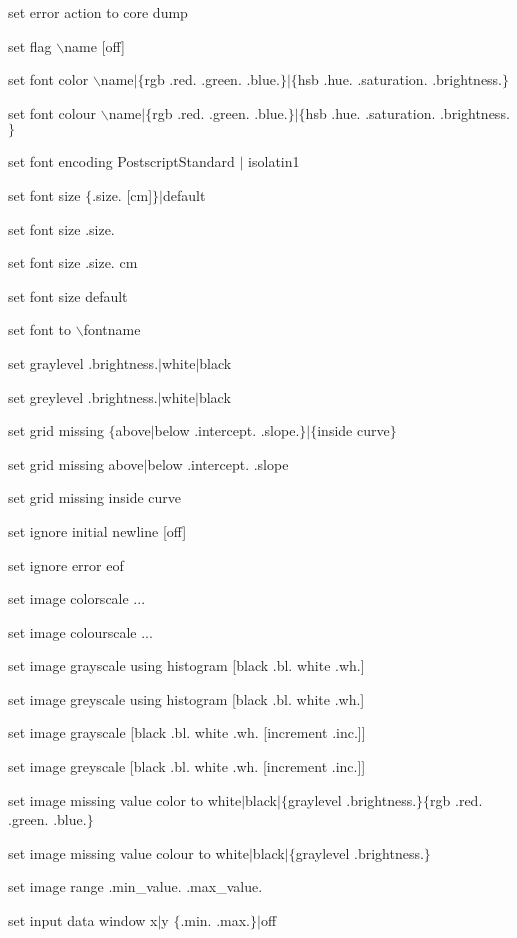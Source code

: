 set error action to core dump

set flag $\backslash$name [off]

set font color $\backslash$name$\mid$$\lbrace$rgb .red. .green. .blue.$\rbrace$$\mid$$\lbrace$hsb .hue. .saturation. .brightness.$\rbrace$

set font colour $\backslash$name$\mid$$\lbrace$rgb .red. .green. .blue.$\rbrace$$\mid$$\lbrace$hsb .hue. .saturation. .brightness.$\rbrace$

set font encoding PostscriptStandard $\mid$ isolatin1

set font size $\lbrace$.size. [cm]$\rbrace$$\mid$default

set font size .size.

set font size .size. cm

set font size default

set font to $\backslash$fontname

set graylevel .brightness.$\mid$white$\mid$black

set greylevel .brightness.$\mid$white$\mid$black

set grid missing $\lbrace$above$\mid$below .intercept. .slope.$\rbrace$$\mid$$\lbrace$inside curve$\rbrace$

set grid missing above$\mid$below .intercept. .slope

set grid missing inside curve

set ignore initial newline [off]

set ignore error eof

set image colorscale ...

set image colourscale ...

set image grayscale using histogram [black .bl. white .wh.]

set image greyscale using histogram [black .bl. white .wh.]

set image grayscale [black .bl. white .wh. [increment .inc.]]

set image greyscale [black .bl. white .wh. [increment .inc.]]

set image missing value color to white$\mid$black$\mid$$\lbrace$graylevel .brightness.$\rbrace$$\lbrace$rgb .red. .green. .blue.$\rbrace$

set image missing value colour to white$\mid$black$\mid$$\lbrace$graylevel .brightness.$\rbrace$

set image range .min\_value. .max\_value.

set input data window x$\mid$y $\lbrace$.min. .max.$\rbrace$$\mid$off


